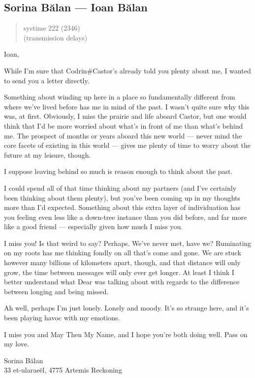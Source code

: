 \hypertarget{sorina-bux103lan-ioan-bux103lan}{%
\subsection{Sorina Bălan — Ioan Bălan}\label{sorina-bux103lan-ioan-bux103lan}}

\begin{quote}
systime 222 (2346)\\
(transmission delays)
\end{quote}

Ioan,

While I'm sure that Codrin\#Castor's already told you plenty about me, I wanted to send you a letter directly.

Something about winding up here in a place so fundamentally different from where we've lived before has me in mind of the past. I wasn't quite sure why this was, at first. Obviously, I miss the prairie and life aboard Castor, but one would think that I'd be more worried about what's in front of me than what's behind me. The prospect of months or years aboard this new world — never mind the core facets of existing in this world — gives me plenty of time to worry about the future at my leisure, though.

I suppose leaving behind so much is reason enough to think about the past.

I could spend all of that time thinking about my partners (and I've certainly been thinking about them plenty), but you've been coming up in my thoughts more than I'd expected. Something about this extra layer of individuation has you feeling even less like a down-tree instance than you did before, and far more like a good friend — especially given how much I miss you.

I miss you! Is that weird to say? Perhaps. We've never met, have we? Ruminating on my roots has me thinking fondly on all that's come and gone. We are stuck however many billions of kilometers apart, though, and that distance will only grow, the time between messages will only ever get longer. At least I think I better understand what Dear was talking about with regards to the difference between longing and being missed.

Ah well, perhaps I'm just lonely. Lonely and moody. It's so strange here, and it's been playing havoc with my emotions.

I miss you and May Then My Name, and I hope you're both doing well. Pass on my love.

Sorina Bălan\\
33 et-ularaeël, 4775 Artemis Reckoning

